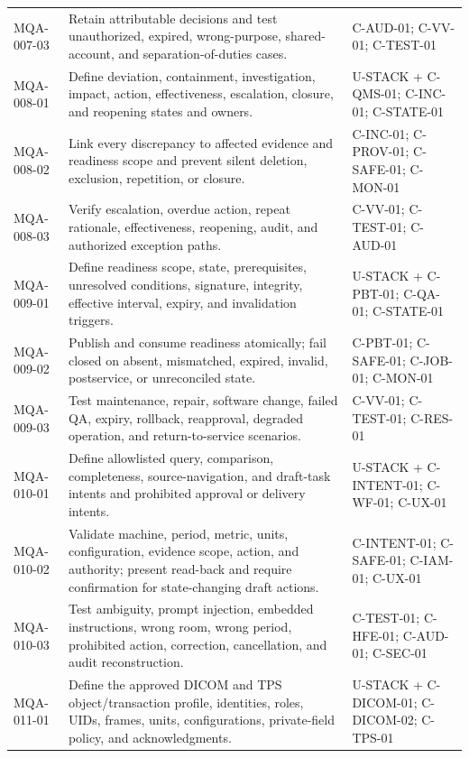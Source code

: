 \documentclass[11pt,letterpaper]{article}
\begin{document}
\begin{scriptsize}
\begin{longtable}{@{}L{0.13\textwidth}L{0.48\textwidth}L{0.31\textwidth}@{}}
MQA-007-03 & Retain attributable decisions and test unauthorized, expired, wrong-purpose, shared-account, and separation-of-duties cases. & C-AUD-01; C-VV-01; C-TEST-01 \\
\addlinespace[3pt]
MQA-008-01 & Define deviation, containment, investigation, impact, action, effectiveness, escalation, closure, and reopening states and owners. & U-STACK + C-QMS-01; C-INC-01; C-STATE-01 \\
MQA-008-02 & Link every discrepancy to affected evidence and readiness scope and prevent silent deletion, exclusion, repetition, or closure. & C-INC-01; C-PROV-01; C-SAFE-01; C-MON-01 \\
MQA-008-03 & Verify escalation, overdue action, repeat rationale, effectiveness, reopening, audit, and authorized exception paths. & C-VV-01; C-TEST-01; C-AUD-01 \\
\addlinespace[3pt]
MQA-009-01 & Define readiness scope, state, prerequisites, unresolved conditions, signature, integrity, effective interval, expiry, and invalidation triggers. & U-STACK + C-PBT-01; C-QA-01; C-STATE-01 \\
MQA-009-02 & Publish and consume readiness atomically; fail closed on absent, mismatched, expired, invalid, postservice, or unreconciled state. & C-PBT-01; C-SAFE-01; C-JOB-01; C-MON-01 \\
MQA-009-03 & Test maintenance, repair, software change, failed QA, expiry, rollback, reapproval, degraded operation, and return-to-service scenarios. & C-VV-01; C-TEST-01; C-RES-01 \\
\addlinespace[3pt]
MQA-010-01 & Define allowlisted query, comparison, completeness, source-navigation, and draft-task intents and prohibited approval or delivery intents. & U-STACK + C-INTENT-01; C-WF-01; C-UX-01 \\
MQA-010-02 & Validate machine, period, metric, units, configuration, evidence scope, action, and authority; present read-back and require confirmation for state-changing draft actions. & C-INTENT-01; C-SAFE-01; C-IAM-01; C-UX-01 \\
MQA-010-03 & Test ambiguity, prompt injection, embedded instructions, wrong room, wrong period, prohibited action, correction, cancellation, and audit reconstruction. & C-TEST-01; C-HFE-01; C-AUD-01; C-SEC-01 \\
\addlinespace[3pt]
MQA-011-01 & Define the approved DICOM and TPS object/transaction profile, identities, roles, UIDs, frames, units, configurations, private-field policy, and acknowledgments. & U-STACK + C-DICOM-01; C-DICOM-02; C-TPS-01 \\

\end{longtable}
\end{scriptsize}
\end{document}
